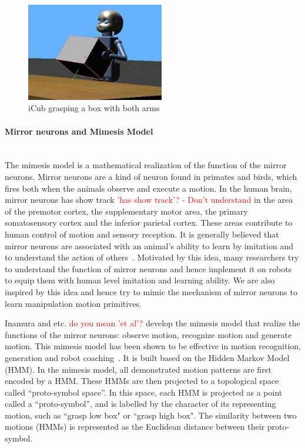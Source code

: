 \begin{figure}
  \centering
  \includegraphics[width=6cm]{./fig_cha5/begin.jpg}
  \caption{ \scriptsize{iCub grasping a box with both arms}
}
    \label{begin}
    \vspace{-0.5cm}
\end{figure}



\paragraph{Mirror neurons and Mimesis Model} ~\\
The mimesis model is a mathematical realization of the function of the mirror neurons. Mirror neurons are a kind of neuron found in primates and birds, which fires both when the animals observe and execute a motion. In the human brain, mirror neurons has show track
\textcolor{red}{'has show track'? - Don't understand}
in the area of the premotor cortex, the supplementary motor area, the primary somatosensory cortex and the inferior parietal cortex. These areas contribute to human control of motion and sensory reception. It is generally believed that mirror neurons are associated with an animal's ability to learn by imitation and to understand the action of others~\citep{rizzolatti2004mirror}. Motivated by this idea, many researchers try to understand the function of mirror neurons and hence implement it on robots to equip them with human level imitation and learning ability. We are also inspired by this idea and hence try to mimic the mechanism of mirror neurons to learn manipulation motion primitives.

Inamura and etc. \textcolor{red}{do you mean 'et al'?} develop the mimesis model that realize the functions of the mirror neurons: observe motion, recognize motion and generate motion.
This mimesis model has been shown to be effective in motion recognition, generation and robot coaching~\citep{inamura2008geometric,okuno2011motion}. It is built based on the Hidden Markov Model (HMM).
In the mimesis model, all demonstrated motion patterns are first encoded by a HMM. These HMMs are then projected to a topological space called ``proto-symbol space''. In this space, each HMM is projected as a point called a ``proto-symbol'', and is labelled by the character of its representing motion, such as ``grasp low box" or ``grasp high box". The similarity between two motions (HMMs) is represented as the Euclidean distance between their proto-symbol.

